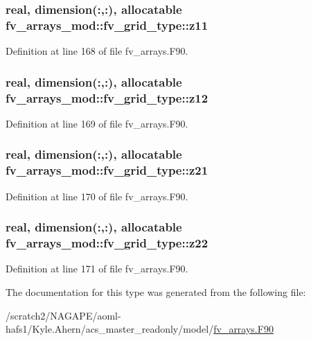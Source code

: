 \subsubsection[{z11}]{\setlength{\rightskip}{0pt plus 5cm}real, dimension(\-:,\-:), allocatable fv\-\_\-arrays\-\_\-mod\-::fv\-\_\-grid\-\_\-type\-::z11}\label{structfv__arrays__mod_1_1fv__grid__type_a61173daebde1950c12444005f06a0c86}


Definition at line 168 of file fv\-\_\-arrays.\-F90.

\subsubsection[{z12}]{\setlength{\rightskip}{0pt plus 5cm}real, dimension(\-:,\-:), allocatable fv\-\_\-arrays\-\_\-mod\-::fv\-\_\-grid\-\_\-type\-::z12}\label{structfv__arrays__mod_1_1fv__grid__type_a424c7bea81647f4db6ed99e7aa356f25}


Definition at line 169 of file fv\-\_\-arrays.\-F90.

\subsubsection[{z21}]{\setlength{\rightskip}{0pt plus 5cm}real, dimension(\-:,\-:), allocatable fv\-\_\-arrays\-\_\-mod\-::fv\-\_\-grid\-\_\-type\-::z21}\label{structfv__arrays__mod_1_1fv__grid__type_ab93ef0fd752a80fee92d1678785883a1}


Definition at line 170 of file fv\-\_\-arrays.\-F90.

\subsubsection[{z22}]{\setlength{\rightskip}{0pt plus 5cm}real, dimension(\-:,\-:), allocatable fv\-\_\-arrays\-\_\-mod\-::fv\-\_\-grid\-\_\-type\-::z22}\label{structfv__arrays__mod_1_1fv__grid__type_a7b7f8aa4fc1c048e446478aea5e5d601}


Definition at line 171 of file fv\-\_\-arrays.\-F90.



The documentation for this type was generated from the following file\-:\begin{DoxyCompactItemize}
\item 
/scratch2/\-N\-A\-G\-A\-P\-E/aoml-\/hafs1/\-Kyle.\-Ahern/acs\-\_\-master\-\_\-readonly/model/\hyperlink{fv__arrays_8F90}{fv\-\_\-arrays.\-F90}\end{DoxyCompactItemize}
